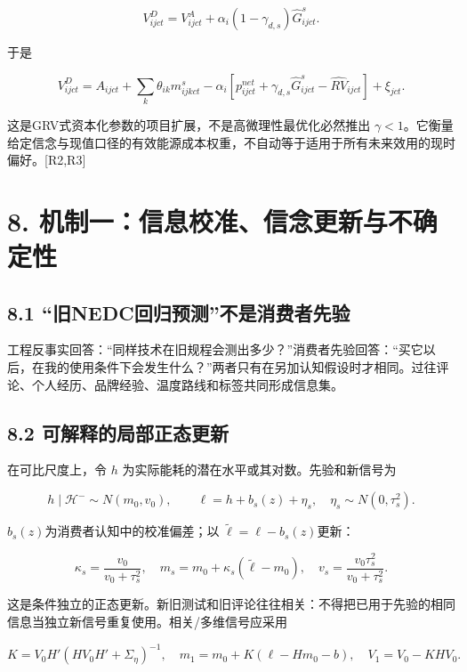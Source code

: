 \documentclass[
  11pt,
]{article}
\begin{document}
\[
V_{ijct}^{D}=V_{ijct}^{A}
+\alpha_i(1-\gamma_{d,s})\widehat G_{ijct}^{s}.
\tag{23}
\]

于是

\[
V_{ijct}^{D}=A_{ijct}+\sum_k\theta_{ik}m_{ijkct}^{s}
-\alpha_i[p_{ijct}^{net}+\gamma_{d,s}\widehat G_{ijct}^{s}-\widehat{RV}_{ijct}]+\xi_{jct}.
\tag{24}
\]

这是GRV式资本化参数的项目扩展，不是高微理性最优化必然推出
\(\gamma<1\)。它衡量给定信念与现值口径的有效能源成本权重，不自动等于适用于所有未来效用的现时偏好。{[}R2,R3{]}

\section{8.
机制一：信息校准、信念更新与不确定性}\label{ux673aux5236ux4e00ux4fe1ux606fux6821ux51c6ux4fe1ux5ff5ux66f4ux65b0ux4e0eux4e0dux786eux5b9aux6027}

\subsection{8.1
``旧NEDC回归预测''不是消费者先验}\label{ux65e7nedcux56deux5f52ux9884ux6d4bux4e0dux662fux6d88ux8d39ux8005ux5148ux9a8c}

工程反事实回答：``同样技术在旧规程会测出多少？''消费者先验回答：``买它以后，在我的使用条件下会发生什么？''两者只有在另加认知假设时才相同。过往评论、个人经历、品牌经验、温度路线和标签共同形成信息集。

\subsection{8.2
可解释的局部正态更新}\label{ux53efux89e3ux91caux7684ux5c40ux90e8ux6b63ux6001ux66f4ux65b0}

在可比尺度上，令 \(h\) 为实际能耗的潜在水平或其对数。先验和新信号为

\[
h\mid\mathcal H^-\sim N(m_0,v_0),\qquad
\ell=h+b_s(z)+\eta_s,\quad\eta_s\sim N(0,\tau_s^2). \tag{25}
\]

\(b_s(z)\)为消费者认知中的校准偏差；以
\(\widetilde\ell=\ell-b_s(z)\)更新：

\[
\kappa_s=\frac{v_0}{v_0+\tau_s^2},\quad
m_s=m_0+\kappa_s(\widetilde\ell-m_0),\quad
v_s=\frac{v_0\tau_s^2}{v_0+\tau_s^2}. \tag{26}
\]

这是条件独立的正态更新。新旧测试和旧评论往往相关：不得把已用于先验的相同信息当独立新信号重复使用。相关/多维信号应采用

\[
K=V_0H'(HV_0H'+\Sigma_\eta)^{-1},\quad
m_1=m_0+K(\ell-Hm_0-b),\quad
V_1=V_0-KHV_0. \tag{27}
\]
\end{document}
